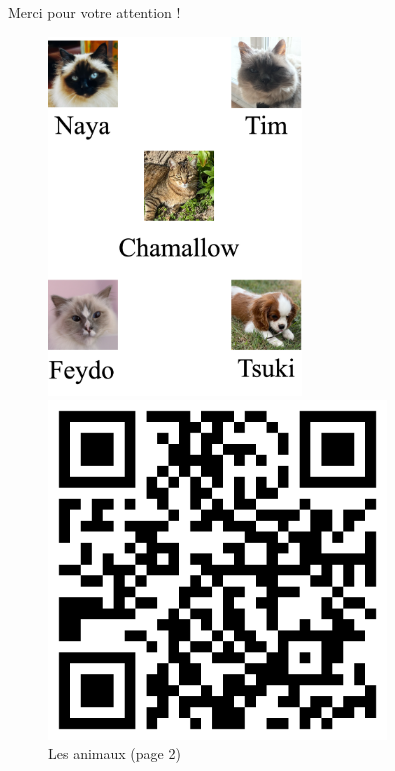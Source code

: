 \documentclass[11pt,aspectratio=169]{beamer}
\begin{document}
\begin{frame}[plain]
    \begin{center}
        \vspace{0.2cm}
        {\color{deepblue}\Huge Merci pour votre attention !}
        
        \vspace{0.5cm}
        
        \begin{figure}[h]
            \centering
            \begin{minipage}{0.45\textwidth}
                \centering
                \includegraphics[width=0.6\textwidth]{animals.png}
                \caption{Les animaux (page 2)}
            \end{minipage}
            \hspace{0.05\textwidth}
            \begin{minipage}{0.45\textwidth}
                \centering
                \includegraphics[width=0.8\textwidth]{code-gh.png}

\end{minipage}
\end{figure}
\end{center}
\end{frame}
\end{document}
